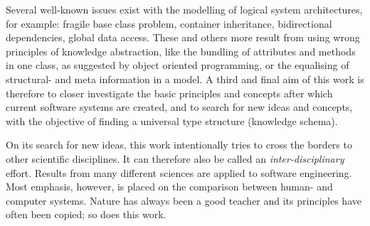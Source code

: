 Several well-known issues exist with the modelling of logical system
architectures, for example: fragile base class problem, container inheritance,
bidirectional dependencies, global data access. These and others more result
from using wrong principles of knowledge abstraction, like the bundling of
attributes and methods in one class, as suggested by object oriented
programming, or the equalising of structural- and meta information in a model.
A third and final aim of this work is therefore to closer investigate the basic
principles and concepts after which current software systems are created, and
to search for new ideas and concepts, with the objective of finding a universal
type structure (knowledge schema).

On its search for new ideas, this work intentionally tries to cross the borders
to other scientific disciplines. It can therefore also be called an
\emph{inter-disciplinary} effort. Results from many different sciences are
applied to software engineering. Most emphasis, however, is placed on the
comparison between human- and computer systems. Nature has always been a good
teacher and its principles have often been copied; so does this work.
